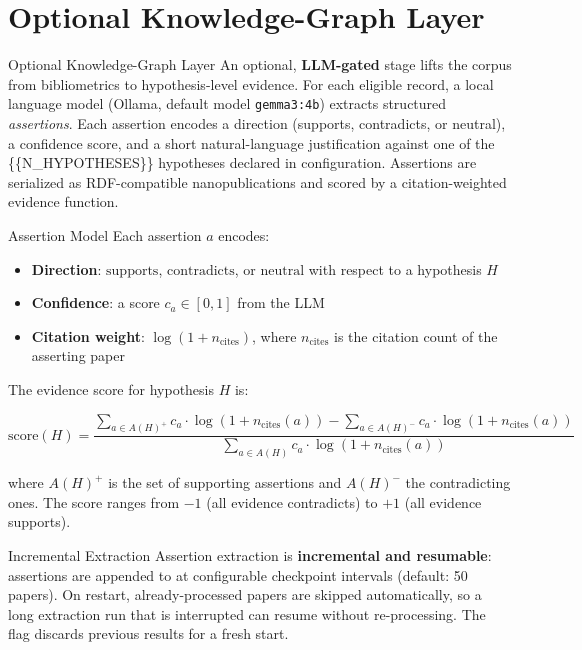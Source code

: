 \documentclass[
  ignorenonframetext,
]{beamer}
\author{}
\date{}
\providecommand{\tightlist}{%
  \setlength{\itemsep}{0pt}\setlength{\parskip}{0pt}}
\begin{document}
\section{Optional Knowledge-Graph
Layer}\label{optional-knowledge-graph-layer}

\begin{frame}{Optional Knowledge-Graph Layer}
An optional, \textbf{LLM-gated} stage lifts the corpus from
bibliometrics to hypothesis-level evidence. For each eligible record, a
local language model (Ollama, default model \texttt{gemma3:4b}) extracts
structured \emph{assertions}. Each assertion encodes a direction
(supports, contradicts, or neutral), a confidence score, and a short
natural-language justification against one of the \{\{N\_HYPOTHESES\}\}
hypotheses declared in configuration. Assertions are serialized as
RDF-compatible nanopublications  and scored
by a citation-weighted evidence function.
\end{frame}

\begin{frame}[allowframebreaks]{Assertion Model}
\label{assertion-model}
Each assertion \(a\) encodes:

\begin{itemize}
\tightlist
\item
  \textbf{Direction}: \(\text{supports}\), \(\text{contradicts}\), or
  \(\text{neutral}\) with respect to a hypothesis \(H\)
\item
  \textbf{Confidence}: a score \(c_a \in [0, 1]\) from the LLM
\item
  \textbf{Citation weight}: \(\log(1 + n_{\text{cites}})\), where
  \(n_{\text{cites}}\) is the citation count of the asserting paper
\end{itemize}

The evidence score for hypothesis \(H\) is:

\[
\text{score}(H) = \frac{\sum_{a \in A(H)^+} c_a \cdot \log(1 + n_{\text{cites}}(a)) -
\sum_{a \in A(H)^-} c_a \cdot \log(1 + n_{\text{cites}}(a))}
{\sum_{a \in A(H)} c_a \cdot \log(1 + n_{\text{cites}}(a))}
\]

where \(A(H)^+\) is the set of supporting assertions and \(A(H)^-\) the
contradicting ones. The score ranges from \(-1\) (all evidence
contradicts) to \(+1\) (all evidence supports).
\end{frame}

\begin{frame}{Incremental Extraction}
\label{incremental-extraction}
Assertion extraction is \textbf{incremental and resumable}: assertions
are appended to  at configurable
checkpoint intervals (default: 50 papers). On restart, already-processed
papers are skipped automatically, so a long extraction run that is
interrupted can resume without re-processing. The
 flag discards previous results for a fresh
start.
\end{frame}
\end{document}
